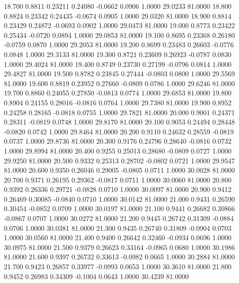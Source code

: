   18.700   0.8811   0.23211   0.24080  -0.0662   0.0906   1.0000  29.0233  81.0000
  18.800   0.8824   0.23342   0.24435  -0.0674   0.0905   1.0000  29.0320  81.0000
  18.900   0.8814   0.23429   0.24872  -0.0693   0.0902   1.0000  29.0473  81.0000
  19.000   0.8773   0.23422   0.25434  -0.0720   0.0894   1.0000  29.0853  81.0000
  19.100   0.8695   0.23368   0.26180  -0.0759   0.0870   1.0000  29.2053  81.0000
  19.200   0.8699   0.23483   0.26603  -0.0776   0.0848   1.0000  29.3133  81.0000
  19.300   0.8721   0.23609   0.26923  -0.0787   0.0830   1.0000  29.4024  81.0000
  19.400   0.8749   0.23730   0.27199  -0.0796   0.0814   1.0000  29.4827  81.0000
  19.500   0.8782   0.23845   0.27444  -0.0803   0.0800   1.0000  29.5569  81.0000
  19.600   0.8819   0.23952   0.27660  -0.0809   0.0786   1.0000  29.6246  81.0000
  19.700   0.8860   0.24055   0.27850  -0.0813   0.0774   1.0000  29.6853  81.0000
  19.800   0.8904   0.24155   0.28016  -0.0816   0.0764   1.0000  29.7380  81.0000
  19.900   0.8952   0.24258   0.28165  -0.0818   0.0755   1.0000  29.7821  81.0000
  20.000   0.9001   0.24371   0.28311  -0.0819   0.0748   1.0000  29.8170  81.0000
  20.100   0.9053   0.24494   0.28448  -0.0820   0.0742   1.0000  29.8464  81.0000
  20.200   0.9110   0.24632   0.28559  -0.0819   0.0737   1.0000  29.8736  81.0000
  20.300   0.9176   0.24796   0.28640  -0.0816   0.0732   1.0000  29.8994  81.0000
  20.400   0.9255   0.25013   0.28680  -0.0809   0.0727   1.0000  29.9250  81.0000
  20.500   0.9332   0.25313   0.28702  -0.0802   0.0721   1.0000  29.9547  81.0000
  20.600   0.9350   0.26046   0.29005  -0.0805   0.0711   1.0000  30.0028  81.0000
  20.700   0.9371   0.26195   0.29362  -0.0817   0.0711   1.0000  30.0060  81.0000
  20.800   0.9392   0.26336   0.29721  -0.0828   0.0710   1.0000  30.0097  81.0000
  20.900   0.9412   0.26469   0.30085  -0.0840   0.0710   1.0000  30.0142  81.0000
  21.000   0.9431   0.26590   0.30454  -0.0852   0.0709   1.0000  30.0197  81.0000
  21.100   0.9441   0.26682   0.30866  -0.0867   0.0707   1.0000  30.0272  81.0000
  21.200   0.9445   0.26742   0.31309  -0.0884   0.0706   1.0000  30.0381  81.0000
  21.300   0.9435   0.26740   0.31809  -0.0904   0.0703   1.0000  30.0560  81.0000
  21.400   0.9400   0.26642   0.32460  -0.0934   0.0696   1.0000  30.0975  81.0000
  21.500   0.9379   0.26623   0.33164  -0.0965   0.0680   1.0000  30.1986  81.0000
  21.600   0.9397   0.26732   0.33613  -0.0982   0.0665   1.0000  30.2884  81.0000
  21.700   0.9423   0.26857   0.33977  -0.0993   0.0653   1.0000  30.3610  81.0000
  21.800   0.9452   0.26983   0.34309  -0.1004   0.0643   1.0000  30.4239  81.0000
